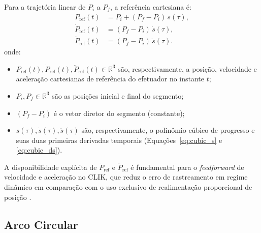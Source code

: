 Para a trajetória linear de $P_i$ a $P_f$, a referência cartesiana é:
\begin{align}
    P_{\text{ref}}(t) &= P_i + (P_f - P_i)\,s(\tau), \label{eq:traj_line_P}\\
    \dot{P}_{\text{ref}}(t) &= (P_f - P_i)\,\dot{s}(\tau), \label{eq:traj_line_V}\\
    \ddot{P}_{\text{ref}}(t) &= (P_f - P_i)\,\ddot{s}(\tau). \label{eq:traj_line_A}
\end{align}
onde:
\begin{itemize}
    \item $P_{\text{ref}}(t), \dot{P}_{\text{ref}}(t), \ddot{P}_{\text{ref}}(t) \in \mathbb{R}^3$ são, respectivamente, a posição, velocidade e aceleração cartesianas de referência do efetuador no instante $t$;
    \item $P_i, P_f \in \mathbb{R}^3$ são as posições inicial e final do segmento;
    \item $(P_f - P_i)$ é o vetor diretor do segmento (constante);
    \item $s(\tau), \dot{s}(\tau), \ddot{s}(\tau)$ são, respectivamente, o polinômio cúbico de progresso e suas duas primeiras derivadas temporais (Equações~\eqref{eq:cubic_s} e \eqref{eq:cubic_ds}).
\end{itemize}

A disponibilidade explícita de $\dot{P}_{\text{ref}}$ e $\ddot{P}_{\text{ref}}$ é fundamental para o \textit{feedforward} de velocidade e aceleração no CLIK, que reduz o erro de rastreamento em regime dinâmico em comparação com o uso exclusivo de realimentação proporcional de posição \cite{chiaverini1994review, siciliano2009robotics}.

\subsection{Arco Circular}

